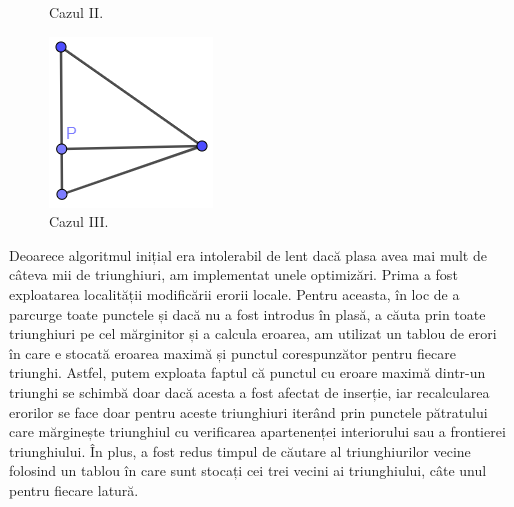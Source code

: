 \documentclass[12pt]{article}
\begin{document}
\begin{figure}[!htb]
\begin{minipage}{0.24\textwidth}
		\caption{Cazul II.}\label{fig:fig14}
	\end{minipage}\hfill
	\begin{minipage}{0.24\textwidth}
		\centering
		\includegraphics[width=.95\linewidth]{caziii.png}
		\caption{Cazul III.}\label{fig:fig15}
	\end{minipage}\hfill
\end{figure}

Deoarece algoritmul inițial era intolerabil de lent dacă plasa avea mai mult de câteva mii de triunghiuri, am implementat unele optimizări. Prima a fost exploatarea localității modificării erorii locale. Pentru aceasta, în loc de a parcurge toate punctele și dacă nu a fost introdus în plasă, a căuta prin toate triunghiuri pe cel mărginitor și a calcula eroarea, am utilizat un tablou de erori în care e stocată eroarea maximă și punctul corespunzător pentru fiecare triunghi. Astfel, putem exploata faptul că punctul cu eroare maximă dintr-un triunghi se schimbă doar dacă acesta a fost afectat de inserție, iar recalcularea erorilor se face doar pentru aceste triunghiuri iterând prin punctele pătratului care mărginește triunghiul cu verificarea apartenenței interiorului sau a frontierei triunghiului. În plus, a fost redus timpul de căutare al triunghiurilor vecine folosind un tablou în care sunt stocați cei trei vecini ai triunghiului, câte unul pentru fiecare latură.
\end{document}
